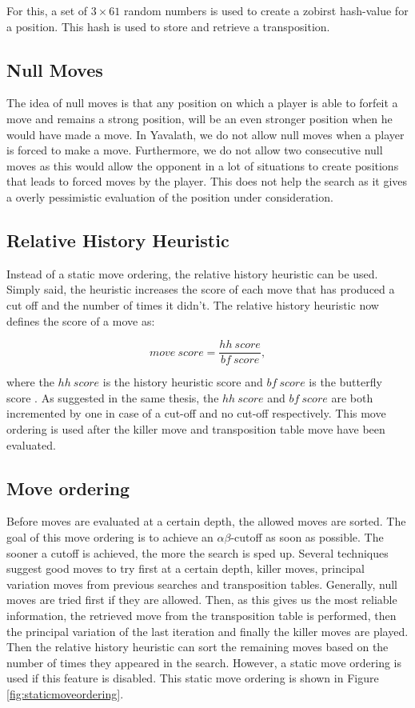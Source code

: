 \documentclass[11pt]{article}
\begin{document}
For this, a set of $3\times 61$ random numbers is used to create a zobirst hash-value for a position. This hash is used to store and retrieve a transposition.

\subsection{Null Moves}
\label{-subsec:nullmoves}
The idea of null moves is that any position on which a player is able to forfeit a move and remains a strong position, will be an even stronger position when he would have made a move. In Yavalath, we do not allow null moves when a player is forced to make a move. Furthermore, we do not allow two consecutive null moves as this would allow the opponent in a lot of situations to create positions that leads to forced moves by the player. This does not help the search as it gives a overly pessimistic evaluation of the position under consideration.

\subsection{Relative History Heuristic}
\label{-subsec:relativehistoryheuristic}
Instead of a static move ordering, the relative history heuristic can be used. Simply said, the heuristic increases the score of each move that has produced a cut off and the number of times it didn't. The relative history heuristic now defines the score of a move as:

\begin{equation}
	move\ score = \frac{hh\ score}{bf\ score},
\end{equation}

where the $hh\ score$ is the history heuristic score and $bf\ score$ is the butterfly score \cite{Winands2004}. As suggested in the same thesis, the $hh\ score$ and $bf\ score$ are both incremented by one in case of a cut-off and no cut-off respectively. This move ordering is used after the killer move and transposition table move have been evaluated.

\subsection{Move ordering}
\label{-subsec:moveordering}
Before moves are evaluated at a certain depth, the allowed moves are sorted. The goal of this move ordering is to achieve an $\alpha\beta$-cutoff as soon as possible. The sooner a cutoff is achieved, the more the search is sped up. Several techniques suggest good moves to try first at a certain depth, killer moves, principal variation moves from previous searches and transposition tables. Generally, null moves are tried first if they are allowed. Then, as this gives us the most reliable information, the retrieved move from the transposition table is performed, then the principal variation of the last iteration and finally the killer moves are played. Then the relative history heuristic can sort the remaining moves based on the number of times they appeared in the search. However, a static move ordering is used if this feature is disabled. This static move ordering is shown in Figure \ref{fig:staticmoveordering}.
\end{document}
